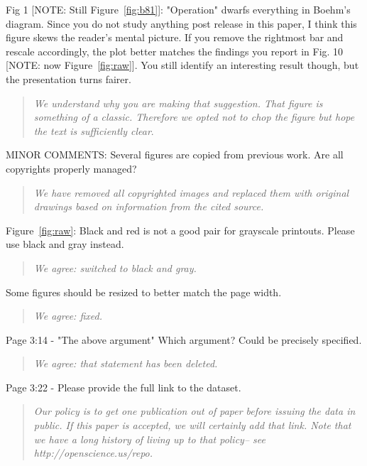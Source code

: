 \documentclass[smallcondensed]{svjour3}
\newcommand{\fig}[1]{Figure~\ref{fig:#1}}
\begin{document}
 
Fig 1 [NOTE: Still \fig{b81}]: "Operation" dwarfs everything in Boehm's diagram.
Since you do not study anything post release in this paper,
I think this figure skews the reader's mental picture. If
you remove the rightmost bar and rescale accordingly, the
plot better matches the findings you report in Fig. 10 [NOTE: now \fig{raw}]. You
still identify an interesting result though, but the
presentation turns fairer. 

\begin{quote}{\em We understand why you are making that suggestion.
That figure is something of a classic. Therefore we opted not to chop the figure but hope the text is sufficiently clear}.
\end{quote}

MINOR COMMENTS: 
Several figures are copied from previous work. Are all copyrights properly
managed?  

\begin{quote}{\em We have removed all copyrighted images and replaced them with original drawings based on information from the cited source.}\end{quote}

 

\fig{raw}: Black and red is not a good pair for
grayscale printouts. Please use black and gray instead.
\begin{quote}{\em  We agree: switched to black and gray.  }\end{quote}

 
 
Some figures should be resized to better match the page width.  
 

\begin{quote}{\em  We agree: fixed. }\end{quote}


 
Page 3:14 - "The above argument" Which argument? Could be precisely specified.
 

\begin{quote}{\em  We agree: that statement has been deleted. }\end{quote}
 
Page 3:22 - Please provide the full link to the dataset.
 
\begin{quote}{\em  Our policy is to get one publication out of paper
before issuing the data in public. If this paper is accepted, we will certainly add that link. Note that we have a long history of living up to that policy-- see http://openscience.us/repo. }\end{quote}  
\end{document}
